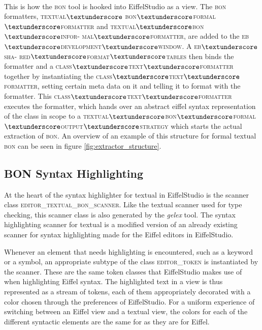 \paragraph{}
This is how the \textsc{bon} tool is hooked into EiffelStudio as a view. The \textsc{bon} formatters, \textsc{textual$\textunderscore$ bon$\textunderscore$formal$\textunderscore$formatter} and \textsc{textual$\textunderscore$bon$\textunderscore$infor- mal$\textunderscore$formatter}, are added to the \textsc{eb$\textunderscore$development$\textunderscore$window}. A \textsc{eb$\textunderscore$sha- red$\textunderscore$format$\textunderscore$tables} then binds the formatter and a \textsc{class$\textunderscore$text$\textunderscore$formatter} together by instantiating the \textsc{class$\textunderscore$text$\textunderscore$formatter}, setting certain meta data on it and telling it to format with the formatter. This \textsc{class$\textunderscore$text$\textunderscore$formatter} executes the formatter, which hands over an abstract eiffel syntax representation of the class in scope to a \textsc{textual$\textunderscore$bon$\textunderscore$formal$\textunderscore$output$\textunderscore$strategy} which starts the actual extraction of \textsc{bon}. An overview of  an example of this structure for formal textual \textsc{bon} can be seen in figure \ref{fig:extractor_structure}.

\subsection{BON Syntax Highlighting}
At the heart of the syntax highlighter for textual \bon{} in EiffelStudio is the scanner class \textsc{editor\_textual\_bon\_scanner}. Like the textual \bon{} scanner used for type checking, this scanner class is also generated by the \textit{gelex} tool. The syntax highlighting scanner for textual \bon{} is a modified version of an already existing scanner for syntax highlighting made for the Eiffel editors in EiffelStudio. 

Whenever an element that needs highlighting is encountered, such as a keyword or a symbol, an appropriate subtype of the class \textsc{editor\_token} is instantiated by the scanner. These are the same token classes that EiffelStudio makes use of when highlighting Eiffel syntax. The highlighted text in a view is thus represented as a stream of tokens, each of them appropriately decorated with a color chosen through the preferences of EiffelStudio. For a uniform experience of switching between an Eiffel view and a textual \bon{} view, the colors for each of the different syntactic elements are the same for \bon{} as they are for Eiffel.

